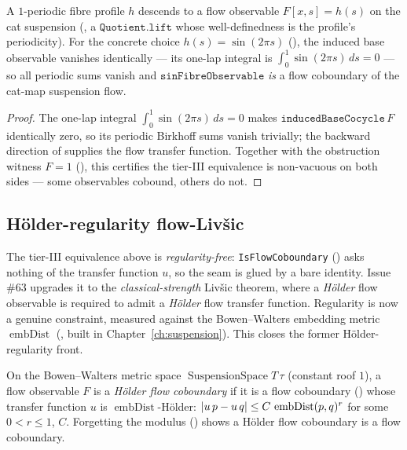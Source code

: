 \begin{theorem}\label{isFlowCoboundary_sinFibreObservable}
  \leanok
  A \(1\)-periodic fibre profile \(h\) descends to a flow observable \(F[x,s] = h(s)\) on the cat
  suspension (, a \(\texttt{Quotient.lift}\) whose
  well-definedness is the profile's periodicity). For the concrete choice \(h(s) = \sin(2\pi s)\)
  (), the induced base observable vanishes
  identically --- its one-lap integral is \(\int_0^{1}\sin(2\pi s)\,ds = 0\) --- so all periodic
  sums vanish and \(\texttt{sinFibreObservable}\) \emph{is} a flow coboundary of the cat-map
  suspension flow.
\end{theorem}
\begin{proof}\leanok
  The one-lap integral \(\int_0^{1}\sin(2\pi s)\,ds = 0\) makes \(\texttt{inducedBaseCocycle}\,F\)
  identically zero, so its periodic Birkhoff sums vanish trivially; the backward direction of
   supplies the flow transfer function. Together with the obstruction
  witness \(F = 1\) (), this certifies the tier-III equivalence is
  non-vacuous on both sides --- some observables cobound, others do not.
\end{proof}

\subsection{Hölder-regularity flow-Livšic}

The tier-III equivalence above is \emph{regularity-free}: \texttt{IsFlowCoboundary}
() asks nothing of the transfer function \(u\), so the seam is glued by a bare
identity. Issue \#63 upgrades it to the \emph{classical-strength} Livšic theorem, where a
\emph{Hölder} flow observable is required to admit a \emph{Hölder} flow transfer function. Regularity
is now a genuine constraint, measured against the Bowen--Walters embedding metric
\(\operatorname{embDist}\) (, built in Chapter~\ref{ch:suspension}). This closes the
former Hölder-regularity front.

\begin{definition}\label{IsHolderFlowCoboundary}
  \leanok
  On the Bowen--Walters metric space \(\operatorname{SuspensionSpace} T\,\tau\) (constant roof \(1\)),
  a flow observable \(F\) is a \emph{Hölder flow coboundary} if it is a flow coboundary
  () whose transfer function \(u\) is \(\operatorname{embDist}\)-Hölder:
  \(\left\lvert u\,p - u\,q \right\rvert\le C\,\operatorname{embDist}(p, q)^{r}\) for some \(0 < r\le 1\), \(C\).
  Forgetting the modulus () shows a
  Hölder flow coboundary is a flow coboundary.
\end{definition}

